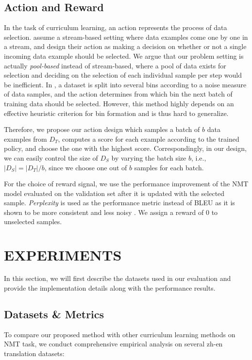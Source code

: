 \documentclass[letterpaper]{article}
\begin{document}
\subsection{Action and Reward}
\label{subsec:actionReward}

In the task of curriculum learning, an action represents the process of data selection. \cite{fang2017learning} assume a stream-based setting where data examples come one by one in a stream, and design their action as making a decision on whether or not a single incoming data example should be selected. We argue that our problem setting is actually \emph{pool-based} instead of stream-based, where a pool of data exists for selection and deciding on the selection of each individual sample per step would be inefficient. In \cite{kumar2019reinforcement}, a dataset is split into several bins according to a noise measure of data samples, and the action determines from which bin the next batch of training data should be selected. However, this method highly depends on an effective heuristic criterion for bin formation and is thus hard to generalize. 

Therefore, we propose our action design which samples a batch of $b$ data examples from $D_T$, computes a score for each example according to the trained policy, and choose the one with the highest score. Correspondingly, in our design, we can easily control the size of $D_S$ by varying the batch size $b$, i.e., $|D_S| = |D_T|/b$, since we choose one out of $b$ samples for each batch.

For the choice of reward signal, we use the performance improvement of the NMT model evaluated on the validation set after it is updated with the selected sample. \emph{Perplexity} is used as the performance metric instead of BLEU as it is shown to be more consistent and less noisy \cite{so2019evolved}. We assign a reward of $0$ to unselected samples. 

\section{EXPERIMENTS}
\label{sec:simu}

In this section, we will first describe the datasets used in our evaluation and provide the implementation details along with the performance results.

\subsection{Datasets \& Metrics}
To compare our proposed method with other curriculum learning methods on NMT task, we conduct comprehensive empirical analysis on several zh-en translation datasets:
\end{document}
